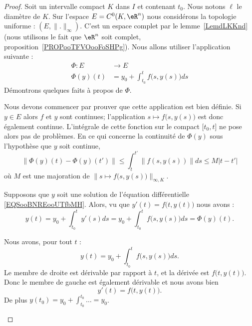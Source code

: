 \begin{proof}
	Soit un intervalle compact \( K\) dans \( I\) et contenant \( t_0\). Nous notons \( \ell\) le diamètre de \( K\). Sur l'espace \( E=C^0(K,\eR^n)\) nous considérons la topologie uniforme : \( (E,\| . \|_{\infty})\). C'est un espace complet par le lemme~\ref{LemdLKKnd} (nous utilisons le fait que \( \eR^n\) soit complet, proposition~\ref{PROPooTFVOooFoSHPg}). Nous allons utiliser l'application suivante :
	\begin{equation}        \label{EQooJUTBooILBKoE}
		\begin{aligned}
			\Phi\colon E & \to E                                  \\
			\Phi(y)(t)   & =y_0+\int_{t_0}^tf\big( s,y(s) \big)ds
		\end{aligned}
	\end{equation}
	Démontrons quelques faits à propos de \( \Phi\).
	\begin{subproof}
		Nous devons commencer par prouver que cette application est bien définie. Si \( y\in E\) alors \( f\) et \( y\) sont continues; l'application \( s\mapsto f\big(s,y(s)\big)\) est donc également continue. L'intégrale de cette fonction sur le compact \( \mathopen[ t_0 , t \mathclose]\) ne pose alors pas de problèmes. En ce qui concerne la continuité de \( \Phi(y)\) sous l'hypothèse que \( y\) soit continue,
		\begin{equation}
			\| \Phi(y)(t)-\Phi(y)(t') \|\leq \int_t^{t'}\| f(s,y(s)) \|ds\leq M| t-t' |
		\end{equation}
		où \( M\) est une majoration de \( \| s\mapsto f\big( s,y(s) \big) \|_{\infty,K}\).

		\spitem[Si \( y\) est solution alors \( \Phi(y)=y\)]

		Supposons que \( y\) soit une solution de l'équation différentielle \eqref{EQSooBNREooUTfbMH}. Alors, vu que \( y'(t)=f\big( t,y(t) \big)\) nous avons :
		\begin{equation}
			y(t)=y_0+\int_{t_0}^ty'(s)ds=y_0+\int_{t_0}^tf\big( s,y(s) \big)ds=\Phi(y)(t).
		\end{equation}

		\spitem[Si \( \Phi(y)=y\) alors \( y\) est solution]

		Nous avons, pour tout \( t\) :
		\begin{equation}
			y(t)=y_0+\int_{t_0}^tf\big( s,y(s) \big)ds.
		\end{equation}
		Le membre de droite est dérivable par rapport à \( t\), et la dérivée est \( f\big( t,y(t) \big) \). Donc le membre de gauche est également dérivable et nous avons bien
		\begin{equation}
			y'(t)=f\big( t,y(t) \big).
		\end{equation}
		De plus \( y(t_0)=y_0+\int_{t_0}^{t_0}\ldots=y_0\).
	\end{subproof}


\end{proof}
